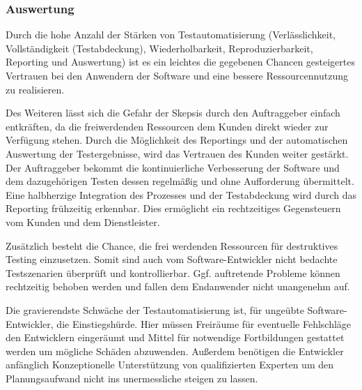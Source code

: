 \subsubsection{Auswertung}
Durch die hohe Anzahl der Stärken von Testautomatisierung (Verlässlichkeit, Vollständigkeit (Testabdeckung), Wiederholbarkeit, Reproduzierbarkeit, Reporting und Auswertung) ist es ein leichtes die gegebenen Chancen gesteigertes Vertrauen bei den Anwendern der Software und eine bessere Ressourcennutzung zu realisieren. 

Des Weiteren lässt sich die Gefahr der Skepsis durch den Auftraggeber einfach entkräften, da die freiwerdenden Ressourcen dem Kunden direkt wieder zur Verfügung stehen. Durch die Möglichkeit des Reportings und der automatischen Auswertung der Testergebnisse, wird das Vertrauen des Kunden weiter gestärkt. Der Auftraggeber bekommt die kontinuierliche Verbesserung der Software und dem dazugehörigen Testen dessen regelmäßig und ohne Aufforderung übermittelt. Eine halbherzige Integration des Prozesses und der Testabdeckung wird durch das Reporting frühzeitig erkennbar. Dies ermöglicht ein rechtzeitiges Gegensteuern vom Kunden und dem Dienstleister.

Zusätzlich besteht die Chance, die frei werdenden Ressourcen für destruktives Testing einzusetzen. Somit sind auch vom Software-Entwickler nicht bedachte Testszenarien überprüft und kontrollierbar. Ggf. auftretende Probleme können rechtzeitig behoben werden und fallen dem Endanwender nicht unangenehm auf.

Die gravierendste Schwäche der Testautomatisierung ist, für ungeübte Software-Entwickler, die Einstiegshürde. Hier müssen Freiräume für eventuelle Fehlschläge den Entwicklern eingeräumt und Mittel für notwendige Fortbildungen gestattet werden um mögliche Schäden abzuwenden. Außerdem benötigen die Entwickler anfänglich Konzeptionelle Unterstützung von qualifizierten Experten um den Planungsaufwand nicht ins unermessliche steigen zu lassen.

